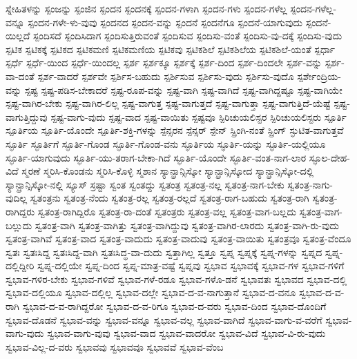 {ಸ್ನೇಹಿತಳನ್ನು
ಸ್ಪಂಜನ್ನು
ಸ್ಪಂಜಿನ
ಸ್ಪಂದನ
ಸ್ಪಂದನಕ್ಕೆ
ಸ್ಪಂದನ-ಗಳಾಗಿ
ಸ್ಪಂದನ-ಗಳು
ಸ್ಪಂದನ-ಗಳೆಲ್ಲ
ಸ್ಪಂದನ-ಗಳೆಲ್ಲ-ವನ್ನೂ
ಸ್ಪಂದನ-ಗಳೇ-ಳು-ವುವು
ಸ್ಪಂದನದ
ಸ್ಪಂದನ-ವನ್ನು
ಸ್ಪಂದನೆ
ಸ್ಪಂದನೆಗೂ
ಸ್ಪಂದನೆ-ಯಾಗುವುದು
ಸ್ಪಂದನೆ-ಯಿಲ್ಲದೆ
ಸ್ಪಂದಿಸದೆ
ಸ್ಪಂದಿಸಿದಾಗ
ಸ್ಪಂದಿಸುತ್ತಿರುವಂತೆ
ಸ್ಪಂದಿಸುವ
ಸ್ಪಂದಿಸು-ವಂತೆ
ಸ್ಪಂದಿಸು-ವು-ದಕ್ಕೆ
ಸ್ಪಂದಿಸು-ವುದು
ಸ್ಪಟಿಕ
ಸ್ಪಟಿಕಕ್ಕೆ
ಸ್ಪಟಿಕದ
ಸ್ಪಟಿಕಮಣಿ
ಸ್ಪಟಿಕಮಣಿಯ
ಸ್ಪಟಿಕವು
ಸ್ಪಟಿಕಶಿಲೆ
ಸ್ಪಟಿಕಶಿಲೆಯ
ಸ್ಪಟಿಕಶಿಲೆ-ಯಂತೆ
ಸ್ಪರ್ಧಾ
ಸ್ಪರ್ಧೆ
ಸ್ಪರ್ಧೆ-ಯಿಂದ
ಸ್ಪರ್ಧೆ-ಯಿಂದಲ್ಲ
ಸ್ಪರ್ಶ
ಸ್ಪರ್ಶಕ್ಕೂ
ಸ್ಪರ್ಶಕ್ಕೆ
ಸ್ಪರ್ಶ-ದಿಂದ
ಸ್ಪರ್ಶ-ದಿಂದಲೇ
ಸ್ಪರ್ಶ-ವನ್ನು
ಸ್ಪರ್ಶ-ವಾ-ದಂತೆ
ಸ್ಪರ್ಶ-ವಾದರೆ
ಸ್ಪರ್ಶವೇ
ಸ್ಪರ್ಶಿಸ-ಬಹುದು
ಸ್ಪರ್ಶಿಸುವ
ಸ್ಪರ್ಶಿಸು-ವುದು
ಸ್ಪರ್ಶಿಸು-ವುದೊ
ಸ್ಪರ್ಶೇಂದ್ರಿಯ-ವನ್ನು
ಸ್ಪಷ್ಟ
ಸ್ಪಷ್ಟ-ಪಡಿಸ-ಬೇಕಾದರೆ
ಸ್ಪಷ್ಟ-ರೂಪ-ವನ್ನು
ಸ್ಪಷ್ಟ-ವಾಗಿ
ಸ್ಪಷ್ಟ-ವಾಗಿದೆ
ಸ್ಪಷ್ಟ-ವಾಗಿದ್ದಷ್ಟೂ
ಸ್ಪಷ್ಟ-ವಾಗಿಯೇ
ಸ್ಪಷ್ಟ-ವಾಗಿರ-ಬೇಕು
ಸ್ಪಷ್ಟ-ವಾಗಿರ-ಲಿಲ್ಲ
ಸ್ಪಷ್ಟ-ವಾಗುತ್ತ
ಸ್ಪಷ್ಟ-ವಾಗುತ್ತದೆ
ಸ್ಪಷ್ಟ-ವಾಗುತ್ತಾ
ಸ್ಪಷ್ಟ-ವಾಗುತ್ತಿದೆ-ಯೆಷ್ಟೆ
ಸ್ಪಷ್ಟ-ವಾಗುತ್ತಿದ್ದುವು
ಸ್ಪಷ್ಟ-ವಾಗು-ವುದು
ಸ್ಪಷ್ಟ-ವಾದ
ಸ್ಪಷ್ಟ-ವಾಯಿತು
ಸ್ಪಷ್ಟವೂ
ಸ್ಪಿರಿಚುಯಲಿಸ್ಟರ
ಸ್ಪಿರಿಚುಯಲಿಸ್ಟರು
ಸ್ಪೂರ್ತಿ
ಸ್ಪೂರ್ತಿಯ
ಸ್ಪೂರ್ತಿ-ಯೊಂದೇ
ಸ್ಪೂರ್ತಿ-ಶಕ್ತಿ-ಗಳನ್ನು
ಸ್ಪೆನ್ಸರನ
ಸ್ಪೆನ್ಸರ್
ಸ್ಪೇನ್
ಸ್ಪ್ರಿಂಗಿ-ನಂತೆ
ಸ್ಪ್ರಿಂಗ್
ಸ್ಫುಟಿತ-ವಾಗುತ್ತವೆ
ಸ್ಫೂರ್ತಿ
ಸ್ಫೂರ್ತಿಗೆ
ಸ್ಫೂರ್ತಿ-ಗೊಂಡ
ಸ್ಫೂರ್ತಿ-ಗೊಂಡ-ವನು
ಸ್ಫೂರ್ತಿಯ
ಸ್ಫೂರ್ತಿ-ಯನ್ನು
ಸ್ಫೂರ್ತಿ-ಯಲ್ಲಿಯೂ
ಸ್ಫೂರ್ತಿ-ಯಾಗುವುದು
ಸ್ಫೂರ್ತಿ-ಯು-ತರಾಗ-ಬೇಕಾ-ಗಿದೆ
ಸ್ಫೂರ್ತಿ-ಯೊಂದೇ
ಸ್ಫೂರ್ತಿ-ವಂತ-ನಾಗ-ಲಾರ
ಸ್ಫೂಲ-ದೇಹ-ವಿದೆ
ಸ್ಮರಣೆ
ಸ್ಮರಿಸಿ-ಕೊಂಡನು
ಸ್ಮರಿಸಿ-ಕೊಳ್ಳಿ
ಸ್ಮಶಾನ
ಸ್ಯಾನ್ಫ್ರಾನ್ಸಿಸ್ಕೋ
ಸ್ಯಾನ್ಫ್ರಾನ್ಸಿಸ್ಕೋದ
ಸ್ಯಾನ್ಫ್ರಾನ್ಸಿಸ್ಕೋ-ದಲ್ಲಿ
ಸ್ಯಾನ್ಫ್ರಾನ್ಸಿಸ್ಕೋ-ನಲ್ಲಿ
ಸ್ಯೂಸ್
ಸ್ರಷ್ಟಾ
ಸ್ವಂತ
ಸ್ವಂತದ್ದು
ಸ್ವತಂತ್ರ
ಸ್ವತಂತ್ರ-ನಲ್ಲ
ಸ್ವತಂತ್ರ-ನಾಗ-ಬೇಕು
ಸ್ವತಂತ್ರ-ನಾಗು-ವುದಿಲ್ಲ
ಸ್ವತಂತ್ರನು
ಸ್ವತಂತ್ರ-ನೆಂದು
ಸ್ವತಂತ್ರ-ರಲ್ಲ
ಸ್ವತಂತ್ರ-ರಲ್ಲದೆ
ಸ್ವತಂತ್ರ-ರಾಗ-ಬಹುದು
ಸ್ವತಂತ್ರ-ರಾಗಿ
ಸ್ವತಂತ್ರ-ರಾಗಿದ್ದರು
ಸ್ವತಂತ್ರ-ರಾಗಿದ್ದಿರೊ
ಸ್ವತಂತ್ರ-ರಾ-ದಂತೆ
ಸ್ವತಂತ್ರರು
ಸ್ವತಂತ್ರ-ವಲ್ಲ
ಸ್ವತಂತ್ರ-ವಾಗ-ಬಲ್ಲದು
ಸ್ವತಂತ್ರ-ವಾಗ-ಬಲ್ಲುದು
ಸ್ವತಂತ್ರ-ವಾಗಿ
ಸ್ವತಂತ್ರ-ವಾಗಿತ್ತು
ಸ್ವತಂತ್ರ-ವಾಗಿದ್ದುವು
ಸ್ವತಂತ್ರ-ವಾಗಿರ-ಲಾರದು
ಸ್ವತಂತ್ರ-ವಾಗಿ-ರು-ವುದು
ಸ್ವತಂತ್ರ-ವಾಗಿವೆ
ಸ್ವತಂತ್ರ-ವಾದ
ಸ್ವತಂತ್ರ-ವಾದುದು
ಸ್ವತಂತ್ರ-ವಾದುವು
ಸ್ವತಂತ್ರ-ವಾಯಿತು
ಸ್ವತಂತ್ರವೂ
ಸ್ವತಂತ್ರ-ವೆಂದೂ
ಸ್ವತಃ
ಸ್ವತಃಸಿದ್ದ
ಸ್ವತಃಸಿದ್ದ-ವಾಗಿ
ಸ್ವತಃಸಿದ್ಧ-ವಾ-ದುದು
ಸ್ವತ್ತಾಗಿಲ್ಲ
ಸ್ವತ್ತೂ
ಸ್ವಪ್ನ
ಸ್ವಪ್ನಕ್ಕೆ
ಸ್ವಪ್ನ-ಗಳನ್ನು
ಸ್ವಪ್ನದ
ಸ್ವಪ್ನ-ದಲ್ಲಿದ್ದೀರಿ
ಸ್ವಪ್ನ-ದಲ್ಲಿಯೇ
ಸ್ವಪ್ನ-ದಿಂದ
ಸ್ವಪ್ನ-ಮಾತ್ರ-ವಷ್ಟೆ
ಸ್ವಪ್ನವು
ಸ್ವಭಾವ
ಸ್ವಭಾವಕ್ಕೆ
ಸ್ವಭಾವ-ಗಳ
ಸ್ವಭಾವ-ಗಳಿಗೆ
ಸ್ವಭಾವ-ಗಳಿರ-ಬೇಕು
ಸ್ವಭಾವ-ಗಳಿವೆ
ಸ್ವಭಾವ-ಗಳೆ-ರಡೂ
ಸ್ವಭಾವ-ಗಳೊ-ಡನೆ
ಸ್ವಭಾವತಃ
ಸ್ವಭಾವದ
ಸ್ವಭಾವ-ದಲ್ಲಿ
ಸ್ವಭಾವ-ದಲ್ಲಿಯೂ
ಸ್ವಭಾವ-ದಲ್ಲಿಲ್ಲ
ಸ್ವಭಾವ-ದಲ್ಲೇ
ಸ್ವಭಾವ-ದ-ವ-ನಾಗುತ್ತಾನೆ
ಸ್ವಭಾವ-ದ-ವನೂ
ಸ್ವಭಾವ-ದ-ವ-ರಾಗಿ
ಸ್ವಭಾವ-ದ-ವ-ರಾಗಿದ್ದರೋ
ಸ್ವಭಾವ-ದ-ವ-ರಿಗೂ
ಸ್ವಭಾವ-ದ-ವರು
ಸ್ವಭಾವ-ದಿಂದ
ಸ್ವಭಾವ-ದೊಂದಿಗೆ
ಸ್ವಭಾವ-ದೊಡನೆ
ಸ್ವಭಾವ-ವನ್ನು
ಸ್ವಭಾವ-ವನ್ನೂ
ಸ್ವಭಾವ-ವಲ್ಲ
ಸ್ವಭಾವ-ವಾಗಿದೆ
ಸ್ವಭಾವ-ವಾಗು-ವ-ವರೆಗೆ
ಸ್ವಭಾವ-ವಾಗು-ವುದು
ಸ್ವಭಾವ-ವಾಗು-ವುವು
ಸ್ವಭಾವ-ವಾದ
ಸ್ವಭಾವ-ವಾದರೋ
ಸ್ವಭಾವ-ವಿದೆ
ಸ್ವಭಾವ-ವಿ-ರು-ವುದು
ಸ್ವಭಾವ-ವಿಲ್ಲ-ದ-ವರು
ಸ್ವಭಾವವು
ಸ್ವಭಾವವೂ
ಸ್ವಭಾವವೆ
ಸ್ವಭಾವ-ವೆಂಬ
}
